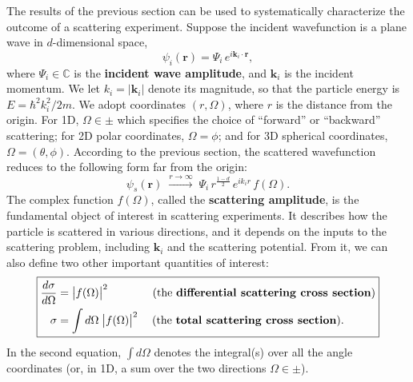 \documentclass[pra,11pt]{revtex4}
\begin{document}
The results of the previous section can be used to systematically
characterize the outcome of a scattering experiment.  Suppose the
incident wavefunction is a plane wave in $d$-dimensional space,
$$\psi_i(\mathbf{r}) = \Psi_i \, e^{i\mathbf{k}_i\cdot\mathbf{r}},$$
where $\Psi_i \in \mathbb{C}$ is the \textbf{incident wave amplitude},
and $\mathbf{k}_i$ is the incident momentum.  We let $k_i =
|\mathbf{k}_i|$ denote its magnitude, so that the particle
energy is $E = \hbar^2k_i^2/2m$.  We adopt coordinates
$(r,\Omega)$, where $r$ is the distance from the origin.  For 1D,
$\Omega \in \pm$ which specifies the choice of ``forward'' or
``backward'' scattering; for 2D polar coordinates, $\Omega = \phi$;
and for 3D spherical coordinates, $\Omega = (\theta,\phi)$.  According
to the previous section, the scattered wavefunction reduces to the
following form far from the origin:
$$\psi_s(\mathbf{r})\;  \overset{r\rightarrow\infty}{\longrightarrow}\; \Psi_i \, r^{\frac{1-d}{2}} \, e^{ik_ir} \, f(\Omega).$$
The complex function $f(\Omega)$, called the \textbf{scattering
  amplitude}, is the fundamental object of interest in scattering
experiments.  It describes how the particle is scattered in various
directions, and it depends on the inputs to the scattering problem,
including $\mathbf{k}_i$ and the scattering potential.  From it, we
can also define two other important quantities of interest:
$$\boxed{\begin{aligned}\frac{d\sigma}{d\Omega} &= \big|f(\Omega)\big|^2 \qquad\quad\quad \text{(the \textbf{differential scattering cross section})} \\ \sigma &= \int d\Omega\; \big|f(\Omega)\big|^2 \quad\; \text{(the \textbf{total scattering cross section}).}
  \end{aligned}}$$
In the second equation, $\int d\Omega$ denotes the integral(s) over
all the angle coordinates (or, in 1D, a sum over the two directions
$\Omega \in \pm$).
\end{document}
